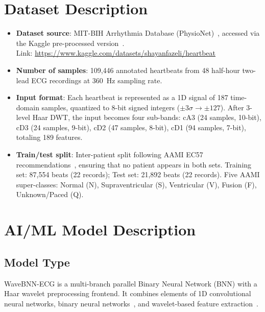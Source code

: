\documentclass[conference]{IEEEtran}
\begin{document}
\section{Dataset Description}

\begin{itemize}[leftmargin=*]
    \item \textbf{Dataset source}: MIT-BIH Arrhythmia Database (PhysioNet)~\cite{moody2001mitbih}, accessed via the Kaggle pre-processed version~\cite{kachuee2018ecg}.\\
    Link: \url{https://www.kaggle.com/datasets/shayanfazeli/heartbeat}

    \item \textbf{Number of samples}: 109,446 annotated heartbeats from 48 half-hour two-lead ECG recordings at 360~Hz sampling rate.

    \item \textbf{Input format}: Each heartbeat is represented as a 1D signal of 187 time-domain samples, quantized to 8-bit signed integers ($\pm3\sigma \rightarrow \pm127$). After 3-level Haar DWT, the input becomes four sub-bands: cA3 (24 samples, 10-bit), cD3 (24 samples, 9-bit), cD2 (47 samples, 8-bit), cD1 (94 samples, 7-bit), totaling 189 features.

    \item \textbf{Train/test split}: Inter-patient split following AAMI EC57 recommendations~\cite{aami2012ec57}, ensuring that no patient appears in both sets. Training set: 87,554 beats (22 records); Test set: 21,892 beats (22 records). Five AAMI super-classes: Normal (N), Supraventricular (S), Ventricular (V), Fusion (F), Unknown/Paced (Q).
\end{itemize}

\section{AI/ML Model Description}

\subsection{Model Type}

WaveBNN-ECG is a multi-branch parallel Binary Neural Network (BNN) with a Haar wavelet preprocessing frontend. It combines elements of 1D convolutional neural networks, binary neural networks~\cite{courbariaux2016binarized}, and wavelet-based feature extraction~\cite{mallat1989wavelet}.
\end{document}
